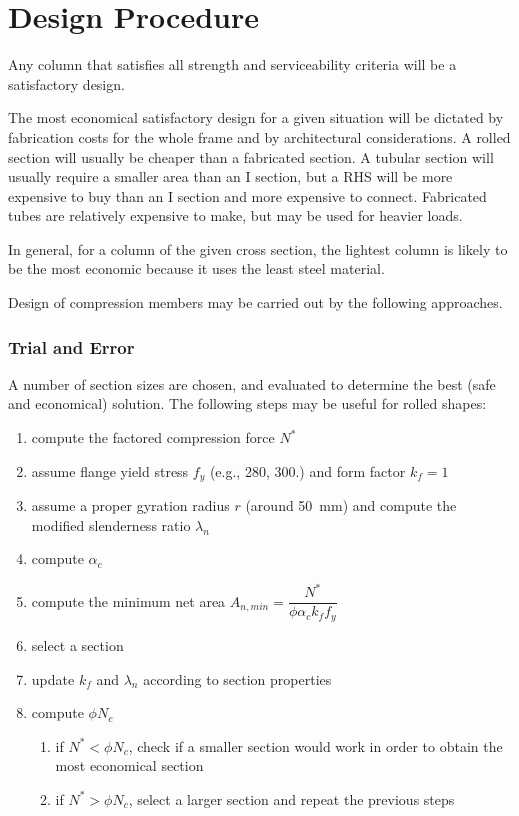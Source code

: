 \section{Design Procedure}
Any column that satisfies all strength and serviceability criteria will be a satisfactory design.

The most economical satisfactory design for a given situation will be dictated by fabrication costs for the whole frame and by architectural considerations. A rolled section will usually be cheaper than a fabricated section. A tubular section will usually require a smaller area than an I section, but a RHS will be more expensive to buy than an I section and more expensive to connect. Fabricated tubes are relatively expensive to make, but may be used for heavier loads.

In general, for a column of the given cross section, the lightest column is likely to be the most economic because it uses the least steel material.

Design of compression members may be carried out by the following approaches.
\subsubsection{Trial and Error}
A number of section sizes are chosen, and evaluated to determine the best (safe and economical) solution. The following steps may be useful for rolled shapes:
\begin{enumerate}
\item compute the factored compression force $N^*$
\item assume flange yield stress $f_y$ (e.g., \SI{280}{\mpa}, \SI{300}{\mpa}.) and form factor $k_f=1$
\item assume a proper gyration radius $r$ (around \SI{50}{\mm}) and compute the modified slenderness ratio $\lambda_n$
\item compute $\alpha_c$
\item compute the minimum net area $A_{n,min}=\dfrac{N^*}{\phi\alpha_ck_ff_y}$
\item select a section
\item update $k_f$ and $\lambda_n$ according to section properties
\item compute $\phi{}N_c$
\begin{enumerate}
\item if $N^*<\phi{}N_c$, check if a smaller section would work in order to obtain the most economical section
\item if $N^*>\phi{}N_c$, select a larger section and repeat the previous steps
\end{enumerate}
\end{enumerate}
